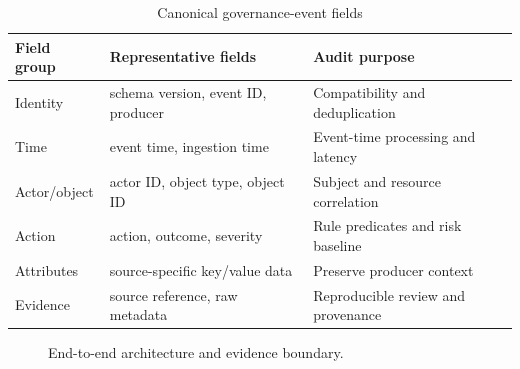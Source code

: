 \documentclass[conference]{IEEEtran}
\begin{document}
\begin{table}[t]\caption{Canonical governance-event fields}\label{tab:contract}\centering\scriptsize\begin{tabular}{p{1.55cm}p{2.6cm}p{2.3cm}}\toprule\textbf{Field group} & \textbf{Representative fields} & \textbf{Audit purpose}\\\midrule Identity & schema version, event ID, producer & Compatibility and deduplication\\ Time & event time, ingestion time & Event-time processing and latency\\ Actor/object & actor ID, object type, object ID & Subject and resource correlation\\ Action & action, outcome, severity & Rule predicates and risk baseline\\ Attributes & source-specific key/value data & Preserve producer context\\ Evidence & source reference, raw metadata & Reproducible review and provenance\\\bottomrule\end{tabular}\end{table}

\begin{figure}[t]
\centering
{}
\caption{End-to-end architecture and evidence boundary.}
\label{fig:architecture}
\end{figure}
\end{document}
